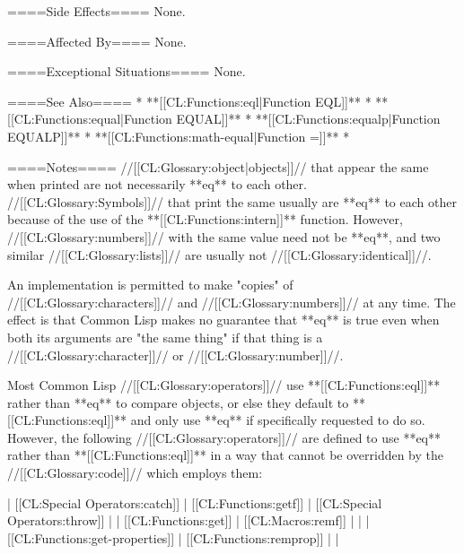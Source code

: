 ====Side Effects====
None.

====Affected By====
None.

====Exceptional Situations====
None.

====See Also====
  * **[[CL:Functions:eql|Function EQL]]**
  * **[[CL:Functions:equal|Function EQUAL]]**
  * **[[CL:Functions:equalp|Function EQUALP]]**
  * **[[CL:Functions:math-equal|Function =]]**
  * {\secref\Compilation}

====Notes====
//[[CL:Glossary:object|objects]]// that appear the same when printed are not necessarily **eq** to each other. //[[CL:Glossary:Symbols]]// that print the same usually are **eq** to each other because of the use of the **[[CL:Functions:intern]]** function. However, //[[CL:Glossary:numbers]]// with the same value need not be **eq**, and two similar //[[CL:Glossary:lists]]// are usually not //[[CL:Glossary:identical]]//.

An implementation is permitted to make "copies" of //[[CL:Glossary:characters]]// and //[[CL:Glossary:numbers]]// at any time. The effect is that Common Lisp makes no guarantee that **eq** is true even when both its arguments are "the same thing" if that thing is a //[[CL:Glossary:character]]// or //[[CL:Glossary:number]]//.

Most Common Lisp //[[CL:Glossary:operators]]// use **[[CL:Functions:eql]]** rather than **eq** to compare objects, or else they default to **[[CL:Functions:eql]]** and only use **eq** if specifically requested to do so. However, the following //[[CL:Glossary:operators]]// are defined to use **eq** rather than **[[CL:Functions:eql]]** in a way that cannot be overridden by the //[[CL:Glossary:code]]// which employs them:

| [[CL:Special Operators:catch]]  | [[CL:Functions:getf]]    | [[CL:Special Operators:throw]] |
| [[CL:Functions:get]]            | [[CL:Macros:remf]]       |                                |
| [[CL:Functions:get-properties]] | [[CL:Functions:remprop]] |                                |

